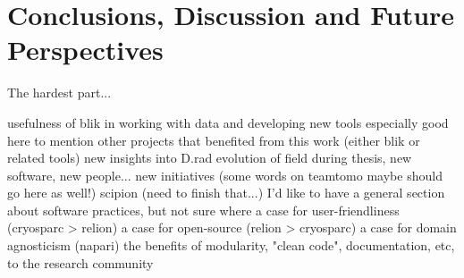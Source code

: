 \chapter{Conclusions, Discussion and Future Perspectives}

The hardest part...

\localtableofcontents

\begin{outline}
\1 usefulness of blik in working with data and developing new tools
    \2 especially good here to mention other projects that benefited from this work (either blik or related tools)
\1 new insights into D.rad
\1 evolution of field during thesis, new software, new people... new initiatives (some words on teamtomo maybe should go here as well!)
\1 scipion (need to finish that...)
\1 I'd like to have a general section about software practices, but not sure where
    \2 a case for user-friendliness (cryosparc > relion)
    \2 a case for open-source (relion > cryosparc)
    \2 a case for domain agnosticism (napari)
    \2 the benefits of modularity, "clean code", documentation, etc, to the research community
\end{outline}
